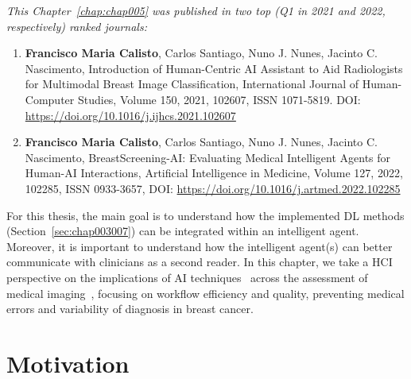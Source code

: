 \clearpage
\label{chap:chap005}

\vspace{0.05mm}

\noindent
{\it This Chapter~\ref{chap:chap005} was published in two top (Q1 in 2021 and 2022, respectively) ranked journals:}

\vspace{0.05mm}

\begin{enumerate}
\item {\bf Francisco Maria Calisto}, Carlos Santiago, Nuno J. Nunes, Jacinto C. Nascimento, Introduction of Human-Centric AI Assistant to Aid Radiologists for Multimodal Breast Image Classification, International Journal of Human-Computer Studies, Volume 150, 2021, 102607, ISSN 1071-5819. DOI: \href{https://doi.org/10.1016/j.ijhcs.2021.102607}{https://doi.org/10.1016/j.ijhcs.2021.102607}
\item {\bf Francisco Maria Calisto}, Carlos Santiago, Nuno J. Nunes, Jacinto C. Nascimento, BreastScreening-AI: Evaluating Medical Intelligent Agents for Human-AI Interactions, Artificial Intelligence in Medicine, Volume 127, 2022, 102285, ISSN 0933-3657, DOI: \href{https://doi.org/10.1016/j.artmed.2022.102285}{https://doi.org/10.1016/j.artmed.2022.102285}
\end{enumerate}

\vspace{0.05mm}

For this thesis, the main goal is to understand how the implemented \ac{DL} methods (Section~\ref{sec:chap003007}) can be integrated within an intelligent agent.
Moreover, it is important to understand how the intelligent agent(s) can better communicate with clinicians as a second reader.
In this chapter, we take a \ac{HCI} perspective on the implications of \ac{AI} techniques~\cite{CALISTO2022102285} across the assessment of medical imaging~\cite{CALISTO2021102607}, focusing on workflow efficiency and quality, preventing medical errors and variability of diagnosis in breast cancer.

\section{Motivation}
\label{sec:chap005001}

